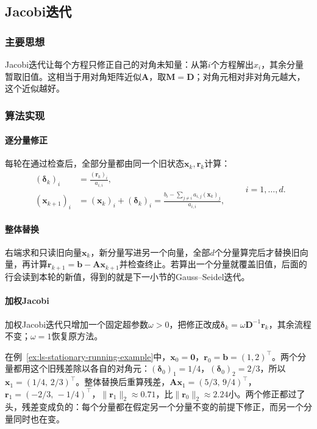 \subsection{Jacobi迭代}
\label{sec:ls-jacobi}

\subsubsection{主要思想}

Jacobi迭代让每个方程只修正自己的对角未知量：从第$i$个方程解出$x_i$，其余分量暂取旧值。这相当于用对角矩阵近似$\bm A$，取$\bm M=\bm D$；对角元相对非对角元越大，这个近似越好。

\subsubsection{算法实现}

\paragraph{逐分量修正}
每轮在通过检查后，全部分量都由同一个旧状态$\bm x_k,\bm r_k$计算：
\[
\begin{aligned}
(\bm\delta_k)_i&=\frac{(\bm r_k)_i}{a_{i,i}},\\
(\bm x_{k+1})_i&=(\bm x_k)_i+(\bm\delta_k)_i
=\frac{b_i-\sum_{j\neq i}a_{i,j}(\bm x_k)_j}{a_{i,i}},
\end{aligned}
\qquad i=1,\ldots,d .
\]
\paragraph{整体替换}
右端求和只读旧向量$\bm x_k$，新分量写进另一个向量，全部$d$个分量算完后才替换旧向量，再计算$\bm r_{k+1}=\bm b-\bm A\bm x_{k+1}$并检查终止。若算出一个分量就覆盖旧值，后面的行会读到本轮的新值，得到的就是下一小节的Gauss--Seidel迭代。

\paragraph{加权Jacobi}
加权Jacobi迭代只增加一个固定超参数$\omega>0$，把修正改成$\bm\delta_k=\omega\bm D^{-1}\bm r_k$，其余流程不变；$\omega=1$恢复原方法。

\begin{example}[Jacobi迭代的第一轮]
\label{ex:ls-jacobi-first-sweep}
在例~\ref{ex:ls-stationary-running-example}中，$\bm x_0=\bm 0$，$\bm r_0=\bm b=(1,2)^\top$。两个分量都用这个旧残差除以各自的对角元：$(\bm\delta_0)_1=1/4$，$(\bm\delta_0)_2=2/3$，所以$\bm x_1=(1/4,\,2/3)^\top$。整体替换后重算残差，$\bm A\bm x_1=(5/3,\,9/4)^\top$，$\bm r_1=(-2/3,\,-1/4)^\top$，$\lVert\bm r_1\rVert_2\approx0.71$，比$\lVert\bm r_0\rVert_2\approx2.24$小。两个修正都过了头，残差变成负的：每个分量都在假定另一个分量不变的前提下修正，而另一个分量同时也在变。
\end{example}

